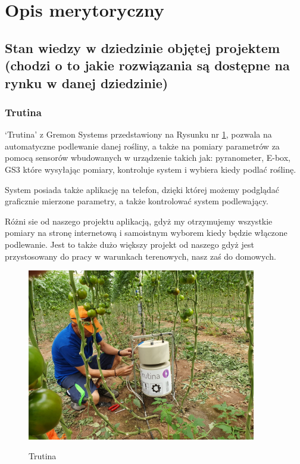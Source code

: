 \documentclass[12pt]{article}
\begin{document}
\section{Opis merytoryczny}

\subsection{Stan wiedzy w dziedzinie objętej projektem (chodzi o to jakie rozwiązania są dostępne na rynku w danej dziedzinie)
}




\newpage

\subsubsection{Trutina}
‘Trutina’ z Gremon Systems przedstawiony na Rysunku nr \ref{fig:Trutina},
 pozwala na automatyczne podlewanie danej rośliny, a także na pomiary parametrów za pomocą sensorów wbudowanych w urządzenie takich jak: pyranometer, E-box, GS3 które wysyłając pomiary, kontroluje system i wybiera kiedy podlać roślinę. 

System posiada także aplikację na telefon, dzięki której możemy podglądać graficznie mierzone parametry, a także kontrolować system podlewający. 


Różni sie od naszego projektu aplikacją, gdyż my otrzymujemy wszystkie pomiary na stronę internetową i samoistnym wyborem kiedy będzie włączone podlewanie. Jest to także dużo większy projekt od naszego gdyż jest przystosowany do pracy w warunkach terenowych, nasz zaś do domowych.



\begin{figure}[!h]
	\begin{center}
		{\includegraphics[width=10cm]{auto_water1.jpg}}
	\end{center}
	\caption{Trutina ~\cite{Trutina}}
	\label{fig:Trutina}
\end{figure}
\end{document}
